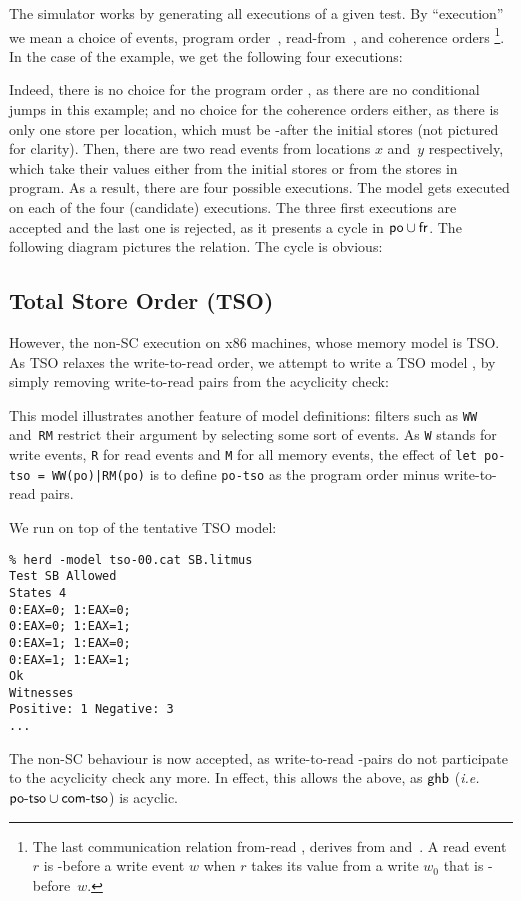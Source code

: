 The simulator \herd{} works by generating all executions of a given test.
By ``execution'' we mean a choice of events,
program order~, read-from~,
and coherence orders \footnote{The last communication relation from-read , derives
from  and~. A read event $r$ is -before
a write event $w$ when $r$ takes its value from a write $w_0$
that is -before~$w$.}.
In the case of the  example, we get the following four executions:
\begin{center}
\quad\quad
{}\quad\quad
{}\quad\quad
{}
\end{center}
Indeed, there is no choice for the program order , as there are no
conditional jumps in this example; and  no choice for the coherence
orders  either, as there is only one store per location, which
must be -after the initial stores (not pictured for clarity).
Then, there are two read events from locations $x$ and~$y$ respectively,
which take their values either from the initial stores or from
the stores in program. As a result, there are four possible executions.
The model  gets executed on each of the four
(candidate) executions. The three first executions
are accepted and the last one is rejected, as it presents a cycle
in $\textsf{po} \cup \textsf{fr}$.
The following diagram pictures the  relation.
The cycle  is obvious:
\begin{center}\end{center}

\subsection{Total Store Order (TSO)}
However, the non-SC execution  on x86 machines,
whose memory model is TSO. As TSO relaxes the write-to-read order, we attempt
to write a TSO model , by simply removing write-to-read
pairs from the acyclicity check:

This model illustrates another feature of model definitions: filters
such as \verb+WW+ and~\verb+RM+ restrict their argument by selecting
some sort of events. As \verb+W+ stands for write events, \verb+R+ for
read events and \verb+M+ for all memory events, the effect of
\verb+let po-tso = WW(po)|RM(po)+ is to define \verb+po-tso+ as the program
order minus write-to-read pairs.

We run  on top of the tentative TSO model:
\begin{verbatim}
% herd -model tso-00.cat SB.litmus 
Test SB Allowed
States 4
0:EAX=0; 1:EAX=0;
0:EAX=0; 1:EAX=1;
0:EAX=1; 1:EAX=0;
0:EAX=1; 1:EAX=1;
Ok
Witnesses
Positive: 1 Negative: 3
...
\end{verbatim}
\label{sb:image}The non-SC behaviour is now accepted, as write-to-read -pairs
do not participate to the acyclicity check any more. In effect, this allows
the  above,
as $\textsf{ghb}$ (\emph{i.e.}
$\textsf{po-tso} \cup \textsf{com-tso}$) is acyclic.
\begin{center}\end{center}


